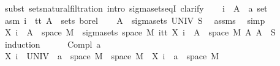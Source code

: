 \begin{isabellebody}
%
\isadelimproof
%
\endisadelimproof
%
\isatagproof
{}\isamarkupfalse%
\ {\isacharparenleft}{\kern0pt}subst\ sets{\isacharunderscore}{\kern0pt}natural{\isacharunderscore}{\kern0pt}filtration{\isacharcomma}{\kern0pt}\ intro\ sigma{\isacharunderscore}{\kern0pt}sets{\isacharunderscore}{\kern0pt}eqI{\isacharcomma}{\kern0pt}\ clarify{\isacharparenright}{\kern0pt}\isanewline
\ \ \isamarkupfalse%
\ i\ \ A\ {\isacharcolon}{\kern0pt}{\isacharcolon}{\kern0pt}\ {\isachardoublequoteopen}{\isacharprime}{\kern0pt}a\ set{\isachardoublequoteclose}\ \isamarkupfalse%
\ asm{\isacharcolon}{\kern0pt}\ {\isachardoublequoteopen}i\ {\isasymin}\ {\isacharbraceleft}{\kern0pt}tt{\isacharbraceright}{\kern0pt}{\isachardoublequoteclose}\ {\isachardoublequoteopen}A\ {\isasymin}\ sets\ borel{\isachardoublequoteclose}\isanewline
\ \ \isamarkupfalse%
\ {\isachardoublequoteopen}A\ {\isasymin}\ sigma{\isacharunderscore}{\kern0pt}sets\ UNIV\ S{\isachardoublequoteclose}\ \isamarkupfalse%
\ assms\ \isamarkupfalse%
\ simp\isanewline
\ \ \isamarkupfalse%
\ {\isachardoublequoteopen}X\ i\ {\isacharminus}{\kern0pt}{\isacharbackquote}{\kern0pt}\ A\ {\isasyminter}\ space\ M\ {\isasymin}\ sigma{\isacharunderscore}{\kern0pt}sets\ {\isacharparenleft}{\kern0pt}space\ M{\isacharparenright}{\kern0pt}\ {\isacharparenleft}{\kern0pt}{\isasymUnion}i{\isasymin}{\isacharbraceleft}{\kern0pt}tt{\isacharbraceright}{\kern0pt}{\isachardot}{\kern0pt}\ {\isacharbraceleft}{\kern0pt}X\ i\ {\isacharminus}{\kern0pt}{\isacharbackquote}{\kern0pt}\ A\ {\isasyminter}\ space\ M\ {\isacharbar}{\kern0pt}A{\isachardot}{\kern0pt}\ A\ {\isasymin}\ S{\isacharbraceright}{\kern0pt}{\isacharparenright}{\kern0pt}{\isachardoublequoteclose}\isanewline
\ \ \isamarkupfalse%
\ {\isacharparenleft}{\kern0pt}induction{\isacharparenright}{\kern0pt}\isanewline
\ \ \ \ \isamarkupfalse%
\ {\isacharparenleft}{\kern0pt}Compl\ a{\isacharparenright}{\kern0pt}\isanewline
\ \ \ \ \isamarkupfalse%
\ {\isachardoublequoteopen}X\ i\ {\isacharminus}{\kern0pt}{\isacharbackquote}{\kern0pt}\ {\isacharparenleft}{\kern0pt}UNIV\ {\isacharminus}{\kern0pt}\ a{\isacharparenright}{\kern0pt}\ {\isasyminter}\ space\ M\ {\isacharequal}{\kern0pt}\ space\ M\ {\isacharminus}{\kern0pt}\ {\isacharparenleft}{\kern0pt}X\ i\ {\isacharminus}{\kern0pt}{\isacharbackquote}{\kern0pt}\ a\ {\isasyminter}\ space\ M{\isacharparenright}{\kern0pt}{\isachardoublequoteclose}\ \isamarkupfalse%

\end{isabellebody}
